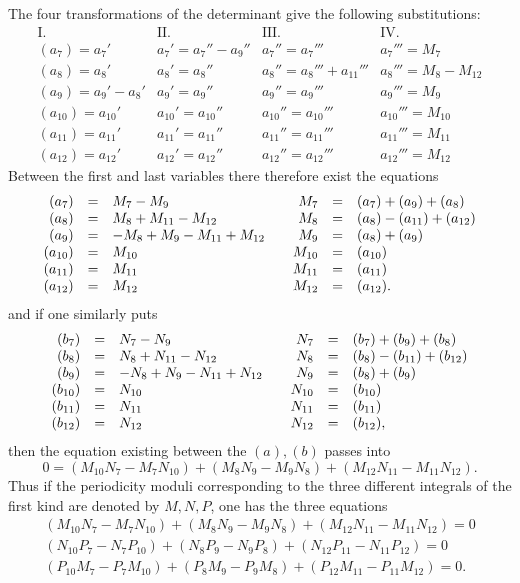 \documentclass[10pt]{article}
\begin{document}
The four transformations of the determinant give the following substitutions:
\[
\begin{array}{c|c|c|c}
\mathrm{I.}&\mathrm{II.}&\mathrm{III.}&\mathrm{IV.}\\
(a_7)=a_7'&a_7'=a_7''-a_9''&a_7''=a_7'''&a_7'''=M_7\\
(a_8)=a_8'&a_8'=a_8''&a_8''=a_8'''+a_{11}'''&a_8'''=M_8-M_{12}\\
(a_9)=a_9'-a_8'&a_9'=a_9''&a_9''=a_9'''&a_9'''=M_9\\
(a_{10})=a_{10}'&a_{10}'=a_{10}''&a_{10}''=a_{10}'''&a_{10}'''=M_{10}\\
(a_{11})=a_{11}'&a_{11}'=a_{11}''&a_{11}''=a_{11}'''&a_{11}'''=M_{11}\\
(a_{12})=a_{12}'&a_{12}'=a_{12}''&a_{12}''=a_{12}'''&a_{12}'''=M_{12}
\end{array}
\]
Between the first and last variables there therefore exist the equations
\[
\begin{array}{rcl@{\qquad}rcl}
(a_7)&=&M_7-M_9&M_7&=&(a_7)+(a_9)+(a_8)\\
(a_8)&=&M_8+M_{11}-M_{12}&M_8&=&(a_8)-(a_{11})+(a_{12})\\
(a_9)&=&-M_8+M_9-M_{11}+M_{12}&M_9&=&(a_8)+(a_9)\\
(a_{10})&=&M_{10}&M_{10}&=&(a_{10})\\
(a_{11})&=&M_{11}&M_{11}&=&(a_{11})\\
(a_{12})&=&M_{12}&M_{12}&=&(a_{12}).
\end{array}
\]
and if one similarly puts
\[
\begin{array}{rcl@{\qquad}rcl}
(b_7)&=&N_7-N_9&N_7&=&(b_7)+(b_9)+(b_8)\\
(b_8)&=&N_8+N_{11}-N_{12}&N_8&=&(b_8)-(b_{11})+(b_{12})\\
(b_9)&=&-N_8+N_9-N_{11}+N_{12}&N_9&=&(b_8)+(b_9)\\
(b_{10})&=&N_{10}&N_{10}&=&(b_{10})\\
(b_{11})&=&N_{11}&N_{11}&=&(b_{11})\\
(b_{12})&=&N_{12}&N_{12}&=&(b_{12}),
\end{array}
\]
then the equation existing between the \((a),(b)\) passes into
\[
0=(M_{10}N_7-M_7N_{10})+(M_8N_9-M_9N_8)+(M_{12}N_{11}-M_{11}N_{12}).
\]
Thus if the periodicity moduli corresponding to the three different integrals of the first kind are denoted by \(M,N,P\), one has the three equations
\[
\begin{array}{l}
(M_{10}N_7-M_7N_{10})+(M_8N_9-M_9N_8)+(M_{12}N_{11}-M_{11}N_{12})=0\\
(N_{10}P_7-N_7P_{10})+(N_8P_9-N_9P_8)+(N_{12}P_{11}-N_{11}P_{12})=0\\
(P_{10}M_7-P_7M_{10})+(P_8M_9-P_9M_8)+(P_{12}M_{11}-P_{11}M_{12})=0.
\end{array}
\]
\end{document}
